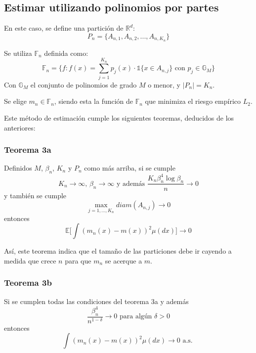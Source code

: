 \documentclass[12pt, a4paper]{article}
\begin{document}
\subsection{Estimar utilizando polinomios por partes}
En este caso, se define una partición de $\mathds{R}^d$:
$$
P_n=\{ A_{n,1}, A_{n,2}, ..., A_{n,K_n} \}
$$

Se utiliza $\mathds{F}_n$ definida como:
$$
\mathds{F}_n
=
\Bigg\{
  f:f(x)
  =
  \sum_{j=1}^{K_n} 
    p_j(x) 
    \cdot 
    \mathds{1}\{x \in A_{n,j}\}  
  \text{ con }
  p_j \in \mathds{G}_M
\Bigg\}
$$
Con $\mathds{G}_M$ el conjunto de polinomios de grado $M$ o menor, y $|P_n|=K_n$.

Se elige $m_n\in\mathds{F}_n$, siendo esta la función de $\mathds{F}_n$ que minimiza el riesgo empírico $L_2$.

Este método de estimación cumple los siguientes teoremas, deducidos de los anteriores:
\subsubsection{Teorema 3a}
Definidos $M$, $\beta_n$, $K_n$ y $P_n$ como más arriba, si se cumple
$$
K_n\rightarrow\infty
\text{, }
\beta_n\rightarrow\infty
\text{ y además }
\frac{ K_n \beta_n^4 \mathop{log} \beta_n }{n}\rightarrow 0
$$
y también se cumple
$$
\mathop{max}_{j=1,...,K_n} diam(A_{n,j}) \rightarrow 0
$$
entonces
$$
\mathds{E}
\Bigg[ 
\int 
(m_n(x)-m(x))^2
\mu(dx)
\Bigg]
\rightarrow 0
$$

Así, este teorema indica que el tamaño de las particiones debe ir cayendo a medida que crece $n$ para que $m_n$ se acerque a $m$.
\subsubsection{Teorema 3b}
Si se cumplen todas las condiciones del teorema 3a y además 
$$
\frac{\beta_n^4}{n^{1-\delta}}\rightarrow 0 \text{ para algún $\delta>0$}
$$
entonces
$$
\int (m_n(x)-m(x))^2 \mu(dx) \rightarrow 0 \text{ a.s. }
$$
\end{document}

